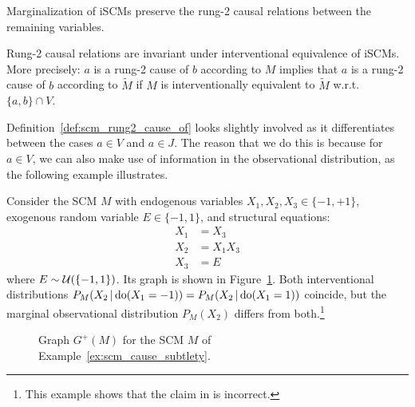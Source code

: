 \begin{Rem}\label{rem:scm_rung2_cause_of_marginalization}
  Marginalization of iSCMs preserve the rung-2 causal relations between the remaining variables.
\end{Rem}
\begin{Rem}\label{rem:scm_rung2_cause_of_interventional_equivalence}
  Rung-2 causal relations are invariant under interventional equivalence of iSCMs.
  More precisely: $a$ is a rung-2 cause of $b$ according to $M$ implies that $a$ is a rung-2 cause of $b$ according to $\tilde{M}$ if $M$ is interventionally equivalent to $\tilde{M}$ w.r.t.\ $\{a,b\} \cap V$.
\end{Rem}
Definition~\ref{def:scm_rung2_cause_of} looks slightly involved as it differentiates between the cases $a \in V$ and $a \in J$.
The reason that we do this is because for $a \in V$, we can also make use of information in the observational distribution, as the following example illustrates.
\begin{Eg}\label{ex:scm_cause_subtlety}
  Consider the SCM $M$ with endogenous variables $X_1,X_2,X_3 \in \{-1,+1\}$, exogenous random variable $E \in \{-1,1\}$, and structural equations:
  $$\begin{aligned}
      X_1 &= X_3 \\
      X_2 &= X_1 X_3 \\
      X_3 &= E
    \end{aligned}$$
  where $E \sim \mathcal{U}(\{-1,1\})$.
  Its graph is shown in Figure~\ref{fig:scm_cause_subtlety}.
  Both interventional distributions $P_M(X_2\operatorname*{|}\operatorname{do}(X_1=-1)) = P_M(X_2\operatorname*{|}\operatorname{do}(X_1=1))$ coincide, but the marginal observational distribution $P_M(X_2)$ differs from both.\footnote{This example shows that the claim in \cite[Proposition 6.13]{PJS17} is incorrect.}
  \begin{figure}
  \begin{center}
  \end{center}
  \caption{Graph $G^+(M)$ for the SCM $M$ of Example~\ref{ex:scm_cause_subtlety}.\label{fig:scm_cause_subtlety}}
\end{figure}
\end{Eg}


